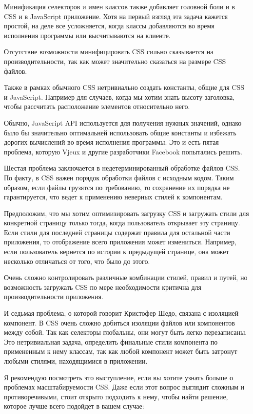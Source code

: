 Минификация селекторов и имен классов также добавляет головной боли и в CSS и в JavaScript приложение. Хотя на первый взгляд эта задача кажется простой, на деле все усложняется, когда классы добавляются во время исполнения программы или высчитываются на клиенте.

Отсутствие возможности минифицировать CSS сильно сказывается на производительности, так как может значительно сказаться на размере CSS файлов.

Также в рамках обычного CSS нетривиально создать константы, общие для CSS и JavaScript. Например для случаев, когда мы хотим знать высоту заголовка, чтобы рассчитать расположение элементов относительно него.

Обычно, JavaScript API используется для получения нужных значений, однако было бы значительно оптимальней использовать общие константы и избежать дорогих вычислений во время исполнения программы. Это и есть пятая проблема, которую Vjeux и другие разработчики Facebook попытались решить.

Шестая проблема заключается в недетерминированный обработке файлов CSS. По факту, в CSS важен порядок обработки файлов с исходным кодом. Таким образом, если файлы грузятся по требованию, то сохранение их порядка не гарантируется, что ведет к применению неверных стилей к компонентам. 

Предположим, что мы хотим оптимизировать загрузку CSS и загружать стили для конкретной страницу только тогда, когда пользователь открывает эту страницу. Если стили для последней страницы содержат правила для  остальной части приложения, то отображение всего приложения может измениться. Например, если пользователь вернется по истории к предыдущей странице, она может несколько отличаться от того, что было до этого.

Очень сложно контролировать различные комбинации стилей, правил и путей, но возможность загружать CSS по мере необходимости критична для производительности приложения.

И седьмая проблема, о которой говорит Кристофер Шедо, связана с изоляцией компонент. В CSS очень сложно добиться изоляции файлов или компонентов между собой. Так как селекторы глобальны, они могут быть легко перезаписаны. Это нетривиальная задача, определить финальные стили компонента по примененным к нему классам, так как любой компонент может быть затронут любыми стилями, находящимися в приложении.

Я рекомендую посмотреть это выступление, если вы хотите узнать больше о проблемах масштабируемости CSS. Даже если этот вопрос выглядит сложным и противоречивыми, стоит открыто подходить к нему, чтобы найти решение, которое лучше всего подойдет в вашем случае:

